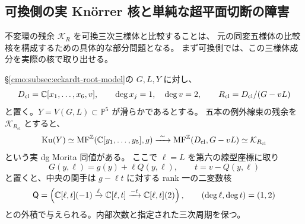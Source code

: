 \subsection{可換側の実 Kn\"orrer 核と単純な超平面切断の障害}

不変環の残余 $\mathcal K_R$ を可換三次三様体と比較することは、
元の同変五様体の比較核を構成するための具体的な部分問題となる。
まず可換側では、この三様体成分を実際の核で取り出せる。

\begin{proposition}
\label{cmo:prop:commutative-invariant-knorrer}
\S\ref{cmo:subsec:eckardt-root-model}の $G,L,Y$ に対し、
\[
 D_{\mathrm{cl}}=\mathbb C[x_1,\ldots,x_6,v],\qquad
 \deg x_j=1,\quad\deg v=2,\qquad
 R_{\mathrm{cl}}=D_{\mathrm{cl}}/(G-vL)
\]
と置く。$Y=V(G,L)\subset\mathbb P^5$ が滑らかであるとする。
五本の例外線束の残余を $\mathcal K_{R_{\mathrm{cl}}}$ とすると、
\begin{equation}\label{cmo:eq:commutative-invariant-knorrer}
 \operatorname{Ku}(Y)\simeq\operatorname{MF}^{\mathbb Z}(\mathbb C[y_1,\ldots,y_5],g)
 \xrightarrow{\ \sim\ }
 \operatorname{MF}^{\mathbb Z}(D_{\mathrm{cl}},G-vL)
 \simeq\mathcal K_{R_{\mathrm{cl}}}
\end{equation}
という実 dg Morita 同値がある。
ここで $\ell=L$ を第六の線型座標に取り
\[
 G(y,\ell)=g(y)+\ell Q(y,\ell),\qquad t=v-Q(y,\ell)
\]
と置くと、中央の関手は $g-\ell t$ に対する rank 一の二変数核
\begin{equation}\label{cmo:eq:commutative-knorrer-kernel}
 \mathsf Q=\left(
  \mathbb C[\ell,t](-1)\xrightarrow{\ell}\mathbb C[\ell,t]
       \xrightarrow{-t}\mathbb C[\ell,t](2)\right),
 \qquad (\deg\ell,\deg t)=(1,2)
\end{equation}
との外積で与えられる。内部次数と指定された三次周期を保つ。
\end{proposition}

